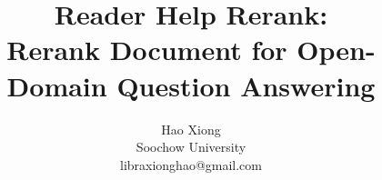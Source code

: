 \documentclass[11pt]{article}
\begin{document}


%
%

\newcommand{\eg}{\textit{e.g.}}  %
\newcommand{\ie}{\textit{i.e.}}  %
\newcommand{\system}{\textsc{RHR}}  %

\title{Reader Help Rerank:\\ Rerank Document for Open-Domain Question Answering}

\newcommand{\sapienza}{$^1$}
\newcommand{\sapienzafair}{$^{1,2}$}
\newcommand{\fair}{$^2$}
\newcommand{\uclfair}{$^{2,3}$}
\newcommand{\ucl}{$^3$}

\author{
Hao Xiong \\
Soochow University \\ 
libraxionghao@gmail.com}

\maketitle
% 




\end{document}
